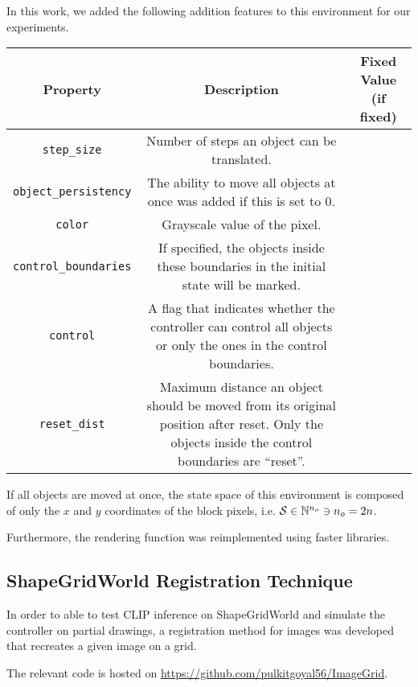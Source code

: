 In this work, we added the following addition features to this environment for our experiments.

\begin{table}[H]
    \centering
    \begin{tabular}{|c c c|}
        \hline
        Property & Description & Fixed Value (if fixed)\\
        \hline\hline
        \texttt{step\_size} & Number of steps an object can be translated. & \\
        \texttt{object\_persistency} & The ability to move all objects at once was added if this is set to \(0\). &\\
        \texttt{color} & Grayscale value of the pixel. & \\
        \texttt{control\_boundaries} & If specified, the objects inside these boundaries in the initial state will be marked. & \\
        \texttt{control} & A flag that indicates whether the controller can control all objects or only the ones in the control boundaries. & \\
        \texttt{reset\_dist} & Maximum distance an object should be moved from its original position after reset. Only the objects inside the control boundaries are ``reset''. & \\
        \hline
    \end{tabular}
\end{table}

If all objects are moved at once, the state space of this environment is composed of only the \(x\) and \(y\) coordinates of the block pixels, i.e. \(\mathcal{S} \in \mathbb{N}^{n_o} \ni n_o = 2 n\).

Furthermore, the rendering function was reimplemented using faster libraries.


\subsection{ShapeGridWorld Registration Technique}
\label{sec:sgw-registration}

In order to able to test CLIP inference on ShapeGridWorld and simulate the controller on partial drawings, a registration method for images was developed that recreates a given image on a grid.


The relevant code is hosted on \url{https://github.com/pulkitgoyal56/ImageGrid}.

